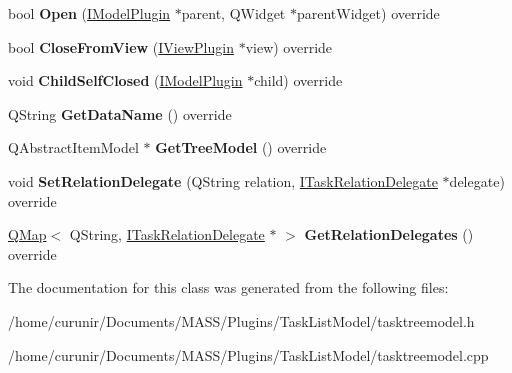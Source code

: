 \begin{DoxyCompactItemize}
\item 
bool {\bfseries Open} (\hyperlink{class_i_model_plugin}{I\+Model\+Plugin} $\ast$parent, Q\+Widget $\ast$parent\+Widget) override\hypertarget{class_task_tree_model_a7a2963fe56d9ef71711b7071dad49368}{}\label{class_task_tree_model_a7a2963fe56d9ef71711b7071dad49368}

\item 
bool {\bfseries Close\+From\+View} (\hyperlink{class_i_view_plugin}{I\+View\+Plugin} $\ast$view) override\hypertarget{class_task_tree_model_adb18285fd4cef22570af2d45b6e67d61}{}\label{class_task_tree_model_adb18285fd4cef22570af2d45b6e67d61}

\item 
void {\bfseries Child\+Self\+Closed} (\hyperlink{class_i_model_plugin}{I\+Model\+Plugin} $\ast$child) override\hypertarget{class_task_tree_model_a2404b109ceb9543d52e1362556db8b94}{}\label{class_task_tree_model_a2404b109ceb9543d52e1362556db8b94}

\item 
Q\+String {\bfseries Get\+Data\+Name} () override\hypertarget{class_task_tree_model_aebbc0558f83bc7f944cc6fc4ece03730}{}\label{class_task_tree_model_aebbc0558f83bc7f944cc6fc4ece03730}

\item 
Q\+Abstract\+Item\+Model $\ast$ {\bfseries Get\+Tree\+Model} () override\hypertarget{class_task_tree_model_a294c3881af033139a5387e3131a1bfb5}{}\label{class_task_tree_model_a294c3881af033139a5387e3131a1bfb5}

\item 
void {\bfseries Set\+Relation\+Delegate} (Q\+String relation, \hyperlink{class_i_task_tree_model_1_1_i_task_relation_delegate}{I\+Task\+Relation\+Delegate} $\ast$delegate) override\hypertarget{class_task_tree_model_afe93ae7affde7bc8ec07766556cb1f76}{}\label{class_task_tree_model_afe93ae7affde7bc8ec07766556cb1f76}

\item 
\hyperlink{class_q_map}{Q\+Map}$<$ Q\+String, \hyperlink{class_i_task_tree_model_1_1_i_task_relation_delegate}{I\+Task\+Relation\+Delegate} $\ast$ $>$ {\bfseries Get\+Relation\+Delegates} () override\hypertarget{class_task_tree_model_ab0438ecf0bc13627d229e63327f0e2bc}{}\label{class_task_tree_model_ab0438ecf0bc13627d229e63327f0e2bc}

\end{DoxyCompactItemize}


The documentation for this class was generated from the following files\+:\begin{DoxyCompactItemize}
\item 
/home/curunir/\+Documents/\+M\+A\+S\+S/\+Plugins/\+Task\+List\+Model/tasktreemodel.\+h\item 
/home/curunir/\+Documents/\+M\+A\+S\+S/\+Plugins/\+Task\+List\+Model/tasktreemodel.\+cpp\end{DoxyCompactItemize}
